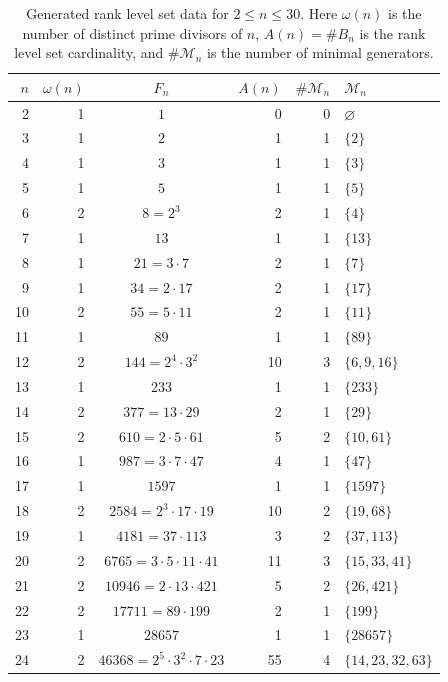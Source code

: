 \begin{table}[ht]
\centering
\small
\caption{Generated rank level set data for $2 \le n \le 30$. Here $\omega(n)$ is the number of distinct prime divisors of $n$, $A(n)=\#B_n$ is the rank level set cardinality, and $\#\mathcal{M}_n$ is the number of minimal generators.}
\label{tab:birth-layer-data-generated}
\begin{tabular}{rrcrrl}
\toprule
$n$ & $\omega(n)$ & $F_n$ & $A(n)$ & $\#\mathcal{M}_n$ & $\mathcal{M}_n$ \\
\midrule
  2 & 1 & $1$ & 0 & 0 & $\varnothing$ \\
  3 & 1 & $2$ & 1 & 1 & $\{2\}$ \\
  4 & 1 & $3$ & 1 & 1 & $\{3\}$ \\
  5 & 1 & $5$ & 1 & 1 & $\{5\}$ \\
  6 & 2 & $8 = 2^{3}$ & 2 & 1 & $\{4\}$ \\
  7 & 1 & $13$ & 1 & 1 & $\{13\}$ \\
  8 & 1 & $21 = 3 \cdot 7$ & 2 & 1 & $\{7\}$ \\
  9 & 1 & $34 = 2 \cdot 17$ & 2 & 1 & $\{17\}$ \\
  10 & 2 & $55 = 5 \cdot 11$ & 2 & 1 & $\{11\}$ \\
  11 & 1 & $89$ & 1 & 1 & $\{89\}$ \\
  12 & 2 & $144 = 2^{4} \cdot 3^{2}$ & 10 & 3 & $\{6,9,16\}$ \\
  13 & 1 & $233$ & 1 & 1 & $\{233\}$ \\
  14 & 2 & $377 = 13 \cdot 29$ & 2 & 1 & $\{29\}$ \\
  15 & 2 & $610 = 2 \cdot 5 \cdot 61$ & 5 & 2 & $\{10,61\}$ \\
  16 & 1 & $987 = 3 \cdot 7 \cdot 47$ & 4 & 1 & $\{47\}$ \\
  17 & 1 & $1597$ & 1 & 1 & $\{1597\}$ \\
  18 & 2 & $2584 = 2^{3} \cdot 17 \cdot 19$ & 10 & 2 & $\{19,68\}$ \\
  19 & 1 & $4181 = 37 \cdot 113$ & 3 & 2 & $\{37,113\}$ \\
  20 & 2 & $6765 = 3 \cdot 5 \cdot 11 \cdot 41$ & 11 & 3 & $\{15,33,41\}$ \\
  21 & 2 & $10946 = 2 \cdot 13 \cdot 421$ & 5 & 2 & $\{26,421\}$ \\
  22 & 2 & $17711 = 89 \cdot 199$ & 2 & 1 & $\{199\}$ \\
  23 & 1 & $28657$ & 1 & 1 & $\{28657\}$ \\
  24 & 2 & $46368 = 2^{5} \cdot 3^{2} \cdot 7 \cdot 23$ & 55 & 4 & $\{14,23,32,63\}$ \\

\end{tabular}
\end{table}
